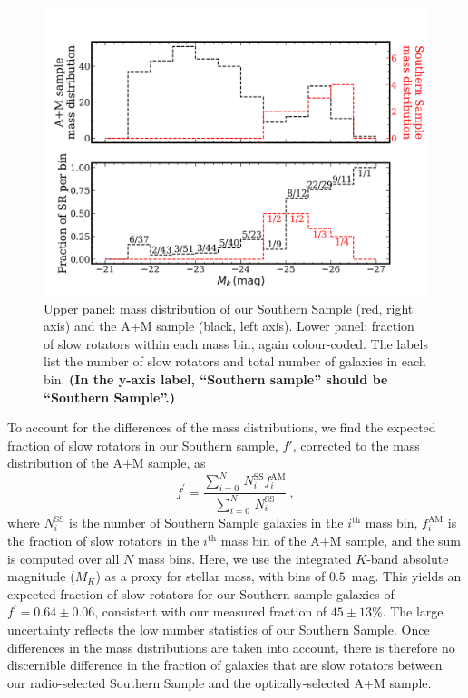 \documentclass[a4paper,fleqn,usenatbib]{mnras}
\begin{document}
\begin{figure}
  \includegraphics[width=\columnwidth]{M_k_binned.png}
  \caption{Upper panel: mass distribution of our Southern Sample (red,
    right axis) and the A+M sample (black, left axis). Lower panel:
    fraction of slow rotators within each mass bin, again
    colour-coded. The labels list the number of slow rotators and
    total number of galaxies in each bin. {\bf (In the y-axis label,
      ``Southern sample'' should be ``Southern Sample''.)}}
  \label{fig:SRmassFraction}
\end{figure}
                      
To account for the differences of the mass distributions, we find the
expected fraction of slow rotators in our Southern sample, $f'$,
corrected to the mass distribution of the A+M sample, as
\begin{equation}
  f^\prime=\frac{\sum_{i=0}^N\,N^\mathrm{SS}_if^\mathrm{AM}_i}{\sum_{i=0}^N\,N^\mathrm{SS}_i}~, 
\end{equation}
where $N^\text{SS}_i$ is the number of Southern Sample galaxies in the
$i^\text{th}$ mass bin, $f^\text{AM}_i$ is the fraction of slow
rotators in the $i^\text{th}$ mass bin of the A+M sample, and the sum
is computed over all $N$ mass bins. Here, we use the integrated
$K$-band absolute magnitude ($M_K$) as a proxy for stellar mass, with
bins of $0.5$~mag. This yields an expected fraction of slow rotators
for our Southern sample galaxies of $f^\prime=0.64\pm0.06$, consistent
with our measured fraction of $45\pm13\%$. The large uncertainty
reflects the low number statistics of our Southern Sample. Once
differences in the mass distributions are taken into account, there is
therefore no discernible difference in the fraction of galaxies that
are slow rotators between our radio-selected Southern Sample and the
optically-selected A+M sample.
\end{document}
